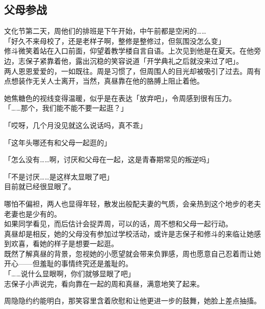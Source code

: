 \subsection{父母参战}

文化节第二天，周他们的排班是下午开始，中午前都是空闲的……\\

「好久不来母校了，还是老样子啊，整修是整修过，但氛围没怎么变」\\

修斗微笑着站在入口前面，仰望着教学楼自言自语。上次见到他是在夏天。在他旁边，志保子紧靠着他，露出沉稳的笑容说道「开学典礼之后就没来过了吧」。\\

两人恩恩爱爱的，一如既往。周是习惯了，但周围人的目光却被吸引了过去。周有点想装作无关人士离开，当然，真昼靠在他的胳膊上阻止着他。

她焦糖色的视线变得温暖，似乎是在表达「放弃吧」，令周感到很有压力。\\

「……那个，我们能不能不要一起逛？」

「哎呀，几个月没见就这么说话吗，真不乖」

「这年头哪还有和父母一起逛的」

「怎么没有……啊，讨厌和父母在一起，这是青春期常见的叛逆吗」

「不是讨厌……是这样太显眼了吧」\\

目前就已经很显眼了。

哪怕不偏袒，两人也显得年轻，散发出般配夫妻的气质，会亲热到这个地步的老夫老妻也是少有的。\\

如果同学看见，而后估计会捉弄周，可以的话，周不想和父母一起行动。\\

真昼却是相反，她的父母没有参加过学校活动，或许是志保子和修斗的来临让她感到欢喜，看她的样子是想要一起逛。\\

既然了解真昼的背景，忽视她的小愿望就会带来负罪感，周也愿意自己忍着而让她开心——但羞耻的事情终究还是羞耻的。\\

「……说什么显眼啊，你们就够显眼了吧」\\

志保子小声说完，看向靠在一起的周和真昼，满意地笑了起来。

周隐隐约约能明白，那笑容里含着欣慰和让他更进一步的鼓舞，她脸上差点抽搐。\\

